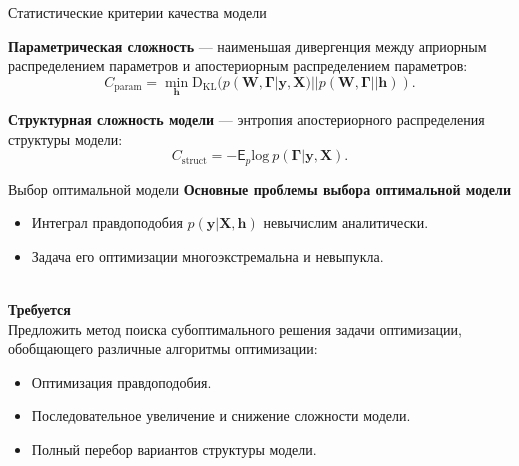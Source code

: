 \documentclass[usenames,dvipsnames,10pt,pdf,utf8,russian,aspectratio=43]{beamer}
\begin{document}
\begin{frame}{Статистические критерии качества модели}


\textbf{Параметрическая сложность} --- наименьшая дивергенция между априорным распределением параметров и апостериорным распределением параметров:
\[
    C_\text{param} = \min_{\mathbf{h}} \text{D}_\text{KL}(p(\mathbf{W}, \boldsymbol{\Gamma}|\mathbf{y}, \mathbf{X})||p(\mathbf{W}, \boldsymbol{\Gamma}||\mathbf{h})).
\]



\textbf{Структурная сложность модели} --- энтропия апостериорного распределения структуры модели:
\[
    C_\text{struct} = -\mathsf{E}_{p} \text{log}~p(\boldsymbol{\Gamma}|\mathbf{y}, \mathbf{X}).
\]

\end{frame}

\iffalse  
\begin{frame}{Выбор оптимальной модели}
\textbf{Основные проблемы выбора оптимальной модели}\\
\begin{itemize}
\item Интеграл правдоподобия $p(\mathbf{y}|\mathbf{X}, \mathbf{h})$ невычислим аналитически.
\item Задача его оптимизации многоэкстремальна и невыпукла.
\end{itemize}
~\\
\textbf{Требуется}\\ 
Предложить метод поиска субоптимального решения задачи оптимизации, обобщающего различные алгоритмы оптимизации:
\begin{itemize}
\item Оптимизация правдоподобия.
\item Последовательное увеличение и снижение сложности модели.
\item Полный перебор вариантов структуры модели.
\end{itemize}

\end{frame} 
   
\end{document}
